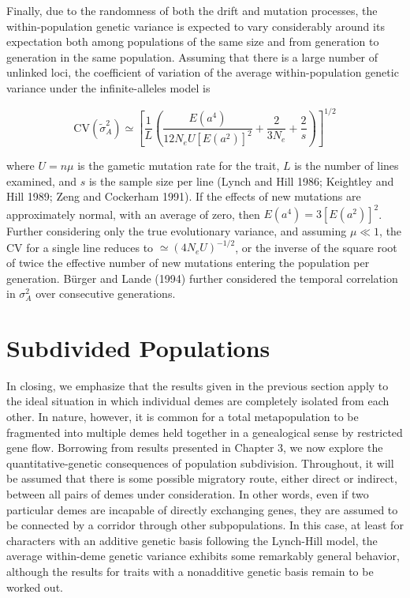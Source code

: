 \documentclass{article}
\begin{document}
Finally, due to the randomness of both the drift and mutation processes, the within-population genetic variance is expected to vary considerably around its expectation both among populations of the same size and from generation to generation in the same population. Assuming that there is a large number of unlinked loci, the coefficient of variation of the average within-population genetic variance under the infinite-alleles model is

\begin{equation}
\mathrm{CV}(\widetilde{\sigma}_{A}^{2})\simeq\left[\frac{1}{L}\left(\frac{E(a^{4})}{12N_{e}U[E(a^{2})]^{2}}+\frac{2}{3N_{e}}+\frac{2}{s}\right)\right]^{1/2}
\tag{11.25}
\label{eq:11_25}
\end{equation}

where $U = n\mu$ is the gametic mutation rate for the trait, $L$ is the number of lines examined, and $s$ is the sample size per line (Lynch and Hill 1986; Keightley and Hill 1989; Zeng and Cockerham 1991). If the effects of new mutations are approximately normal, with an average of zero, then $E(a^4) = 3[E(a^2)]^2$. Further considering only the true evolutionary variance, and assuming $\mu \ll 1$, the CV for a single line reduces to $\simeq(4N_e U)^{-1/2}$, or the inverse of the square root of twice the effective number of new mutations entering the population per generation. Bürger and Lande (1994) further considered the temporal correlation in $\sigma_A^2$ over consecutive generations.

\section{Subdivided Populations}
In closing, we emphasize that the results given in the previous section apply to the ideal situation in which individual demes are completely isolated from each other. In nature, however, it is common for a total metapopulation to be fragmented into multiple demes held together in a genealogical sense by restricted gene flow. Borrowing from results presented in Chapter 3, we now explore the quantitative-genetic consequences of population subdivision. Throughout, it will be assumed that there is some possible migratory route, either direct or indirect, between all pairs of demes under consideration. In other words, even if two particular demes are incapable of directly exchanging genes, they are assumed to be connected by a corridor through other subpopulations. In this case, at least for characters with an additive genetic basis following the Lynch-Hill model, the average within-deme genetic variance exhibits some remarkably general behavior, although the results for traits with a nonadditive genetic basis remain to be worked out.
\end{document}
